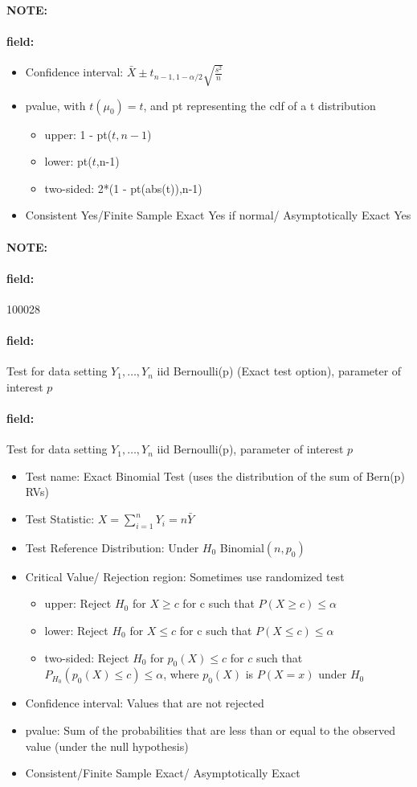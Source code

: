 \documentclass[12pt]{article}
\newenvironment{note}{\paragraph{NOTE:}}{}
\newenvironment{field}{\paragraph{field:}}{}
\begin{document}
\begin{note}
\begin{field}
\begin{itemize}
   \item Confidence interval: $\bar{X} \pm t_{n-1,1-\alpha/2}\sqrt{\frac{s^2}{n}}$
   \item pvalue, with $t(\mu_0)  = t$, and pt representing the cdf of a t distribution
         \begin{itemize}
          \item upper: 1 - pt($t,n-1$)
          \item lower: pt($t$,n-1)
          \item two-sided: 2*(1 - pt(abs(t)),n-1)
         \end{itemize}
   \item Consistent Yes/Finite Sample Exact Yes if normal/ Asymptotically Exact Yes
  \end{itemize}
 \end{field}
\end{note}


\begin{note} \begin{field} \tiny 100028 \end{field}
 \begin{field}
  Test for data setting $Y_1, \ldots, Y_n$ iid Bernoulli(p) (Exact test option), parameter of interest $p$

 \end{field}
 \begin{field}
  Test for data setting $Y_1, \ldots, Y_n$ iid Bernoulli(p), parameter of interest $p$
  \begin{itemize}
   \item Test name: Exact Binomial Test (uses the distribution of the sum of Bern(p) RVs)
   \item Test Statistic: $X = \sum_{i=1}^n Y_i = n\bar{Y}$
   \item Test Reference Distribution: Under $H_0$ Binomial$(n,p_0)$
   \item Critical Value/ Rejection region: Sometimes use randomized test
         \begin{itemize}
          \item upper: Reject $H_0$ for $X \geq c$ for c such that $P(X \geq c)\leq \alpha$
          \item lower: Reject $H_0$ for $X \leq c$ for c such that $P(X \leq c)\leq \alpha$
          \item two-sided: Reject $H_0$ for $p_0(X)\leq c$ for $c$ such that$P_{H_0}(p_0(X) \leq c)\leq \alpha$, where $p_0(X)$ is $P(X = x)$ under $H_0$
         \end{itemize}
   \item Confidence interval: Values that are not rejected
   \item pvalue: Sum of the probabilities that are less than or equal to the observed value (under the null hypothesis)
   \item Consistent/Finite Sample Exact/ Asymptotically Exact
  \end{itemize}
 \end{field}
\end{note}
\end{document}
